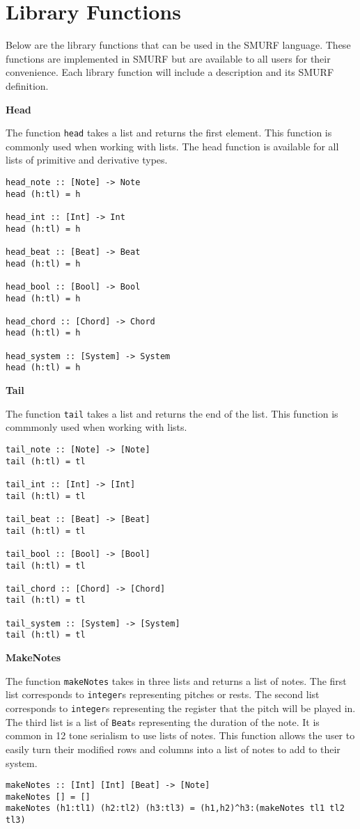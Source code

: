 \section{Library Functions}

Below are the library functions that can be used in the SMURF language. 
These functions are implemented in SMURF but are available to all users 
for their convenience. Each library function will include a description 
and its SMURF definition. \newline

\noindent\textbf{Head}

The function \texttt{head} takes a list and returns the first element. 
This function is commonly used when working with lists. The head function
is available for all lists of primitive and derivative types. 

\begin{verbatim}
head_note :: [Note] -> Note
head (h:tl) = h

head_int :: [Int] -> Int
head (h:tl) = h

head_beat :: [Beat] -> Beat
head (h:tl) = h

head_bool :: [Bool] -> Bool
head (h:tl) = h

head_chord :: [Chord] -> Chord
head (h:tl) = h

head_system :: [System] -> System
head (h:tl) = h

\end{verbatim} 


\noindent\textbf{Tail}

The function \texttt{tail} takes a list and returns the end of the list.
This function is commmonly used when working with lists. 

\begin{verbatim}
tail_note :: [Note] -> [Note]
tail (h:tl) = tl

tail_int :: [Int] -> [Int]
tail (h:tl) = tl

tail_beat :: [Beat] -> [Beat]
tail (h:tl) = tl

tail_bool :: [Bool] -> [Bool]
tail (h:tl) = tl

tail_chord :: [Chord] -> [Chord]
tail (h:tl) = tl

tail_system :: [System] -> [System]
tail (h:tl) = tl

\end{verbatim} 


\noindent\textbf{MakeNotes}

The function \texttt{makeNotes} takes in three lists and returns a list 
of notes. The first list corresponds to \texttt{integer}s representing 
pitches or rests. The second list corresponds to \texttt{integer}s representing the register that the pitch will be played in. The third list is a list 
of \texttt{Beat}s representing the duration of the note. It is common in 
12 tone serialism to use lists of notes. This function allows the user 
to easily turn their modified rows and columns into a list of notes to add 
to their system. 

\begin{verbatim}
makeNotes :: [Int] [Int] [Beat] -> [Note]
makeNotes [] = []
makeNotes (h1:tl1) (h2:tl2) (h3:tl3) = (h1,h2)^h3:(makeNotes tl1 tl2 tl3)
\end{verbatim}
